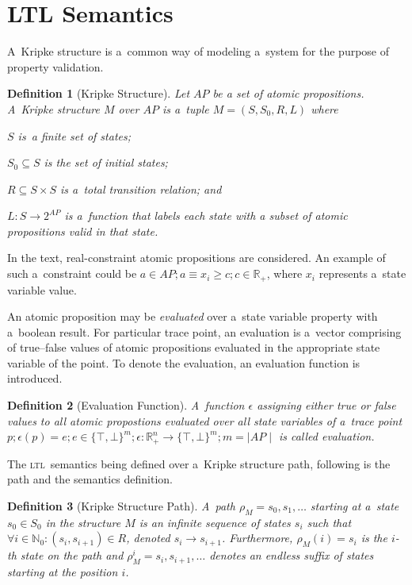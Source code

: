 \documentclass[12pt,oneside,draft]{fithesis}
\newcommand{\ltl}{\textsc{ltl}~}
\newcommand{\mReal}{\mathbb{R}}
\newcommand{\mNatural}{\mathbb{N}}
\newtheorem{mydef}{Definition}
\begin{document}
\section{LTL Semantics}
A~Kripke structure is a~common way of modeling a~system for the purpose
of property validation\cite{clarke}.
\begin{mydef}[Kripke Structure]
Let ${AP}$ be a set of atomic propositions.
A~Kripke structure\cite{clarke} $M$ over $AP$ is a~tuple
$M=(S, S_0, R, L)$ where
\begin{inparaenum}
	\item{}$S$ is~a finite set of states;
	\item{}$S_0\subseteq{}S$ is the set of initial states;
	\item{}$R\subseteq{}S\times{}S$ is a~total transition relation; and
	\item{}$L:S\rightarrow{}2^{AP}$ is a~function that labels each state
		with a subset of atomic propositions valid in that state.
\end{inparaenum}
\end{mydef}
In the text, real-constraint atomic propositions are considered.
An example of such a~constraint could be
$a\in AP;a\equiv x_i \geq c;c\in\mReal_{+}$, where $x_i$ represents
a~state variable value.

An atomic proposition may be \emph{evaluated}
over a~state variable property with a~boolean result. For particular
trace point, an evaluation is a~vector comprising of true--false values
of atomic propositions evaluated in the appropriate state variable of
the point. To denote the evaluation, an evaluation function is
introduced.
\begin{mydef}[Evaluation Function]
A~function $\epsilon$ assigning either true or false values to
all atomic propostions evaluated over all state variables of a~trace
point $p;\epsilon(p)=e;e\in\{\top,\bot\}^m; \epsilon:\mReal_{+}^n
\rightarrow\{\top,\bot\}^m;m=\mid AP\mid$ is called evaluation.
\end{mydef}

The \ltl semantics being defined over a~Kripke structure
path\cite{clarke}, following is the path and the semantics definition.
\begin{mydef}[Kripke Structure Path]
A~path $\rho_M=s_0,s_1,\dotsc$ starting at a~state
$s_0\in S_0$ in the structure $M$ is an infinite sequence of states
$s_i$ such that $\forall i \in \mNatural_0: (s_i, s_{i+1}) \in R$,
denoted $s_i\rightarrow s_{i+1}$. 
Furthermore, $\rho_M(i)=s_i$ is the $i$-th state on the path and
$\rho_M^i=s_i,s_{i+1},\dotsc$ denotes an endless suffix of states
starting at the position $i$.
\end{mydef}
\end{document}
